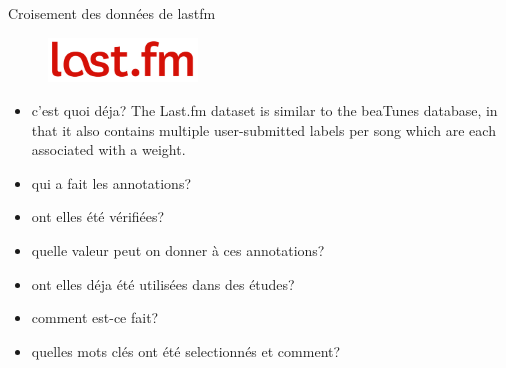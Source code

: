 \documentclass{beamer}
\begin{document}
\begin{frame}{Croisement des données de lastfm} %
\begin{figure}
\centering
\includegraphics[width=150px]{images/lastfm.jpg}
\end{figure}
\begin{itemize}
    \item c'est quoi déja?
        The Last.fm dataset is similar to the beaTunes database,
        in that it also contains multiple user-submitted labels per
        song which are each associated with a weight.
    \item qui a fait les annotations?
    \item ont elles été vérifiées?
    \item quelle valeur peut on donner à ces annotations?
    \item ont elles déja été utilisées dans des études?
    \item comment est-ce fait?
    \item quelles mots clés ont été selectionnés et comment?
\end{itemize}
\end{frame} %

\begin{frame}{}
\begin{figure}
\centering
\end{figure}
\end{frame}
\end{document}

